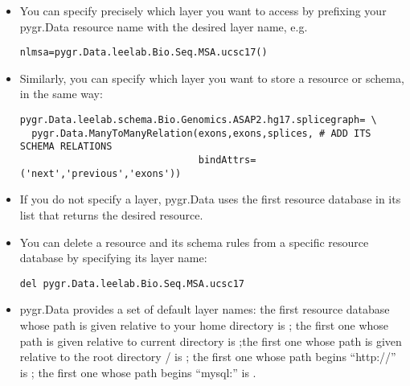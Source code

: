 \documentclass{howto}
\begin{document}
\begin{itemize}
\item You can specify precisely which layer you want to access by prefixing
your pygr.Data resource name with the desired layer name, e.g.
\begin{verbatim}
nlmsa=pygr.Data.leelab.Bio.Seq.MSA.ucsc17()
\end{verbatim}

\item Similarly, you can specify which layer you want to store a resource
or schema, in the same way:
\begin{verbatim}
pygr.Data.leelab.schema.Bio.Genomics.ASAP2.hg17.splicegraph= \
  pygr.Data.ManyToManyRelation(exons,exons,splices, # ADD ITS SCHEMA RELATIONS
                               bindAttrs=('next','previous','exons'))
\end{verbatim}

\item If you do not specify a layer, pygr.Data uses the first resource
database in its list that returns the desired resource.

\item You can delete a resource and its schema rules from a specific resource
database by specifying its layer name:
\begin{verbatim}
del pygr.Data.leelab.Bio.Seq.MSA.ucsc17
\end{verbatim}

\item pygr.Data provides a set of default layer names:
the first resource database whose path is given relative to 
your home directory is ; the first one whose path is given
relative to current directory is \code{here};the first one whose path is given
relative to the root directory / is \code{system};
the first one whose path begins ``http://'' is ;
the first one whose path begins ``mysql:'' is .

\end{itemize}
\end{document}
